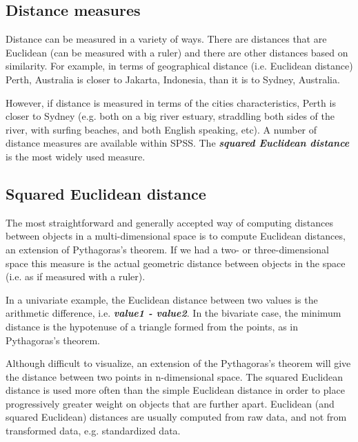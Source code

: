 \subsection{Distance measures}
Distance can be measured in a variety of ways. There are distances that are Euclidean (can be measured with a ruler) and there are other distances based on similarity. For example, in terms of
geographical distance (i.e. Euclidean distance) Perth, Australia is closer to Jakarta, Indonesia, than it is to Sydney, Australia.

However, if distance is measured in terms of the cities characteristics, Perth is closer to Sydney (e.g. both on a big river estuary, straddling both sides of the river, with surfing beaches, and both English speaking, etc). A number of distance measures are available within SPSS. The \textbf{\textit{squared Euclidean distance}} is the most widely used measure.

\subsection{Squared Euclidean distance}

The most straightforward and generally accepted way of computing distances between objects in a multi-dimensional space is to compute Euclidean distances, an extension of Pythagoras's theorem.
If we had a two- or three-dimensional space this measure is the actual geometric distance between objects in the space (i.e. as if measured with a ruler).

In a univariate example, the Euclidean distance between two values is the arithmetic difference, i.e. \textbf{\textit{value1 - value2}}. In the bivariate case, the minimum distance is the hypotenuse of a triangle formed from the points, as in Pythagoras's theorem.

Although difficult to visualize, an extension of the Pythagoras's theorem will give the distance between two points in n-dimensional space. The squared Euclidean distance is used more often than the simple Euclidean distance in order to place progressively greater weight on objects that are further apart. Euclidean (and squared Euclidean) distances are usually computed from raw data, and not from transformed data, e.g. standardized data.
